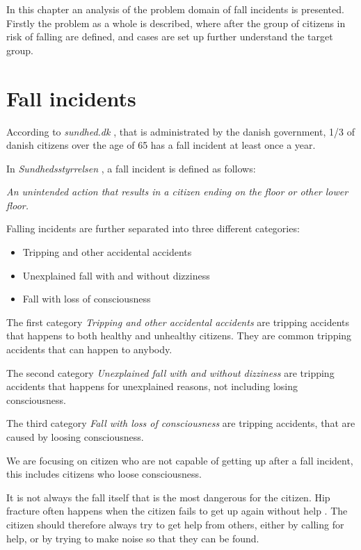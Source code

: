\label{preliminaries:problemanalysis}

In this chapter an analysis of the problem domain of fall incidents is presented. Firstly the problem as a whole is described, where after the group of citizens in risk of falling are defined, and cases are set up further understand the target group.

\section{Fall incidents}
According to \textit{sundhed.dk} \cite{SundhedFald}, that is administrated by the danish government, 1/3 of danish citizens over the age of 65 has a fall incident at least once a year.

In \textit{Sundhedsstyrrelsen} \cite{Sundhedsstyrrelsen:Faldpatienter}, a fall incident is defined as follows:

\begin{center}
    \textit{An unintended action that results in a citizen ending on the floor or other lower floor.}
\end{center}

Falling incidents are further separated into three different categories:
\begin{itemize}
    \item Tripping and other accidental accidents
    \item Unexplained fall with and without dizziness
    \item Fall with loss of consciousness
\end{itemize}

The first category \textit{Tripping and other accidental accidents} are tripping accidents that happens to both healthy and unhealthy citizens. They are common tripping accidents that can happen to anybody.

The second category \textit{Unexplained fall with and without dizziness} are tripping accidents that happens for unexplained reasons, not including losing  consciousness.

The third category \textit{Fall with loss of consciousness} are tripping accidents, that are caused by loosing consciousness.

We are focusing on citizen who are not capable of getting up after a fall incident, this includes citizens who loose consciousness.

It is not always the fall itself that is the most dangerous for the citizen. Hip fracture often happens when the citizen fails to get up again without help \cite{CekuraFald}. The citizen should therefore always try to get help from others, either by calling for help, or by trying to make noise so that they can be found.

